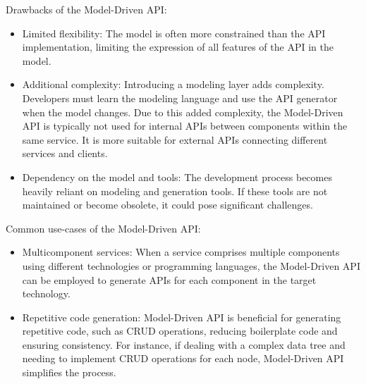 Drawbacks of the Model-Driven API:

\begin{itemize}
    \item Limited flexibility:
    The model is often more constrained than the API implementation, limiting the expression
    of all features of the API in the model.
    \item Additional complexity:
    Introducing a modeling layer adds complexity.
    Developers must learn the modeling language and use the API generator when the model changes.
    Due to this added complexity, the Model-Driven API is typically not used for internal APIs between components
    within the same service.
    It is more suitable for external APIs connecting different services and clients.
    \item Dependency on the model and tools:
    The development process becomes heavily reliant on modeling and generation tools.
    If these tools are not maintained or become obsolete, it could pose significant challenges.
\end{itemize}

Common use-cases of the Model-Driven API:

\begin{itemize}
    \item Multicomponent services:
    When a service comprises multiple components using different technologies or programming languages,
    the Model-Driven API can be employed to generate APIs for each component in the target technology.
    \item Repetitive code generation:
    Model-Driven API is beneficial for generating repetitive code, such as CRUD operations,
    reducing boilerplate code and ensuring consistency.
    For instance, if dealing with a complex data tree and needing to implement CRUD operations for each node,
    Model-Driven API simplifies the process.
\end{itemize}

